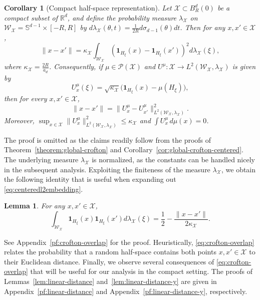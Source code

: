 \documentclass[11pt]{amsart}
\newtheorem{lemma}[theorem]{Lemma}
\newtheorem{corollary}[theorem]{Corollary}
\theoremstyle{definition}
\theoremstyle{remark}
\newcommand{\R}{\mathbb{R}}
\newcommand{\1}{\mathbf{1}}
\newcommand{\Sd}{\mathbb{S}}
\newcommand{\one}{\mathbf{1}}
\numberwithin{equation}{section}
\begin{document}
\begin{corollary}[Compact half-space representation]\label{thm:euclidean-crofton}\label{cor:crofton-centered} Let $\mathcal{X} \subset B^d_R(0)$ be a compact subset of $\R^d$, and define the probability measure $\lambda_{\mathcal{X}}$ on $\mathcal{W}_{\mathcal{X}} = \Sd^{d-1} \times [-R,R]$ by $d\lambda_\mathcal{X}(\theta,t) = \frac{1}{2R}d\sigma_{d-1}(\theta) dt$. Then for any $x,x' \in \mathcal{X}$,
    \begin{equation}
    \label{eq:euclidean-crofton}
        \|x-x'\|
        =\kappa_{\mathcal{X}}\int_{\mathcal{W}_{\mathcal{X}}}
        \left(\mathbf 1_{H_\xi}(x)-\mathbf 1_{H_\xi}(x')\right)^2
        d\lambda_{\mathcal{X}}(\xi),
    \end{equation} 
    where $\kappa_{\mathcal{X}} = \frac{2R}{a_d}$. Consequently, if $\mu\in\mathcal P(\mathcal X)$ and
$U^\mu:\mathcal X\to
L^2(\mathcal W_{\mathcal X},\lambda_{\mathcal X})$ is given by
\begin{equation}\label{eq:centered-crofton}
U_x^\mu(\xi)
=
\sqrt{\kappa_{\mathcal X}}
\bigl(\one_{H_\xi}(x)-\mu(H_\xi)\bigr),
\end{equation}
then for every $x,x' \in \mathcal{X}$,
\begin{equation}\label{eq:centeredl2embedding}
\|x-x'\|
=
\|U_x^\mu-U_{x'}^\mu\|^2_{L^2(\mathcal{W}_\mathcal{X}, \lambda_\mathcal{X})}.
\end{equation}
Moreover, $\sup_{x\in\mathcal X}\|U_x^\mu\|^2_{L^2(\mathcal{W}_\mathcal{X}, \lambda_\mathcal{X})}\leq
\kappa_{\mathcal X}$ and 
$\int U_x^\mu\,d\mu(x)=0$.
\end{corollary}

The proof is omitted as the claims readily follow from the proofs of Theorem~\ref{theorem:global-crofton} and Corollary~\ref{cor:global-crofton-centered}. The underlying measure $\lambda_\mathcal{X}$ is normalized, as the constants can be handled nicely in the subsequent analysis. Exploiting the finiteness of the measure $\lambda_\mathcal{X}$, we obtain the following identity that is useful when expanding out \eqref{eq:centeredl2embedding}.
\begin{lemma} \label{lem:crofton-overlap}
    For any $x,x'\in \mathcal{X}$,
    \begin{equation} \label{eq:crofton-overlap}
        \int_{\mathcal{W}_{\mathcal{X}}}
        \mathbf 1_{H_\xi}(x)\mathbf 1_{H_\xi}(x')
        d\lambda_{\mathcal{X}}(\xi)
        =\frac12-\frac{\|x-x'\|}{2\kappa_{\mathcal X}}.
    \end{equation}
\end{lemma}
See Appendix~\ref{pf:crofton-overlap} for the proof. Heuristically, \eqref{eq:crofton-overlap} relates the probability that a random half-space contains both points $x,x' \in \mathcal{X}$ to their Euclidean distance. Finally, we observe several consequences of \eqref{eq:crofton-overlap} that will be useful for our analysis in the compact setting. The proofs of Lemmas~\ref{lem:linear-distance} and~\ref{lem:linear-distance-y} are given in Appendix~\ref{pf:linear-distance} and Appendix~\ref{pf:linear-distance-y}, respectively.
\end{document}
